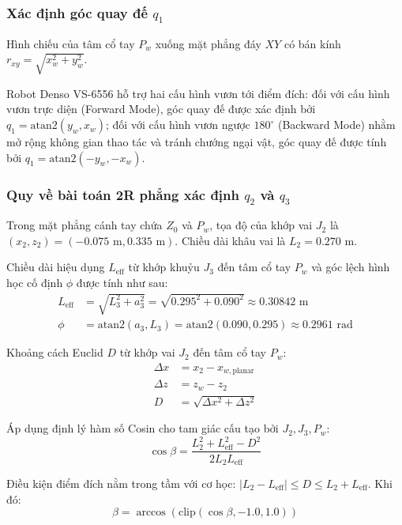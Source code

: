 \subsubsection{Xác định góc quay đế $q_1$}
Hình chiếu của tâm cổ tay $P_w$ xuống mặt phẳng đáy $XY$ có bán kính $r_{xy} = \sqrt{x_w^2 + y_w^2}$.

Robot Denso VS-6556 hỗ trợ hai cấu hình vươn tới điểm đích: đối với cấu hình vươn trực diện (Forward Mode), góc quay đế được xác định bởi $q_1 = \text{atan2}(y_w, x_w)$; đối với cấu hình vươn ngược $180^\circ$ (Backward Mode) nhằm mở rộng không gian thao tác và tránh chướng ngại vật, góc quay đế được tính bởi $q_1 = \text{atan2}(-y_w, -x_w)$.

\subsubsection{Quy về bài toán 2R phẳng xác định $q_2$ và $q_3$}
Trong mặt phẳng cánh tay chứa $Z_0$ và $P_w$, tọa độ của khớp vai $J_2$ là $(x_2, z_2) = (-0.075\text{ m}, 0.335\text{ m})$. Chiều dài khâu vai là $L_2 = 0.270\text{ m}$.

Chiều dài hiệu dụng $L_{\text{eff}}$ từ khớp khuỷu $J_3$ đến tâm cổ tay $P_w$ và góc lệch hình học cố định $\phi$ được tính như sau:
\begin{align}
    L_{\text{eff}} &= \sqrt{L_3^2 + a_3^2} = \sqrt{0.295^2 + 0.090^2} \approx 0.30842\text{ m} \\
    \phi &= \text{atan2}(a_3, L_3) = \text{atan2}(0.090, 0.295) \approx 0.2961\text{ rad}
\end{align}

Khoảng cách Euclid $D$ từ khớp vai $J_2$ đến tâm cổ tay $P_w$:
\begin{align}
    \Delta x &= x_2 - x_{w,\text{planar}} \\
    \Delta z &= z_w - z_2 \\
    D &= \sqrt{\Delta x^2 + \Delta z^2}
\end{align}

Áp dụng định lý hàm số Cosin cho tam giác cấu tạo bởi $J_2, J_3, P_w$:
\begin{equation}
    \cos\beta = \frac{L_2^2 + L_{\text{eff}}^2 - D^2}{2 L_2 L_{\text{eff}}}
\end{equation}

Điều kiện điểm đích nằm trong tầm với cơ học: $|L_2 - L_{\text{eff}}| \le D \le L_2 + L_{\text{eff}}$. Khi đó:
\begin{equation}
    \beta = \arccos\left(\text{clip}(\cos\beta, -1.0, 1.0)\right)
\end{equation}

